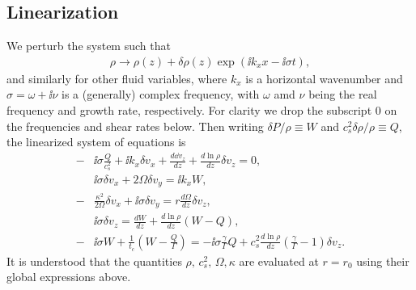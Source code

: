 \subsection{Linearization}
We perturb the system such that
\begin{align}
  \rho \to \rho(z) + \delta\rho(z)\exp{\left(\ii k_x x - \ii\sigma
      t\right)},    
\end{align}
and similarly for other fluid variables, where $k_x$ is a horizontal
wavenumber and $\sigma = \omega + \ii \nu$ is a (generally) complex
frequency, with $\omega$ amd $\nu$ being the real frequency and growth
rate, respectively. For clarity we drop the subscript $0$ on the
frequencies and shear rates below. Then writing $\delta P /\rho \equiv W$
and $c_s^2\delta\rho/\rho\equiv Q$, the linearized system of equations
is   
 \begin{align}
   -&\ii\sigma \frac{Q}{c_s^2} + \ii k_x \delta v_x + \frac{d\dd
     v_z}{dz} + \frac{d\ln{\rho}}{dz}\delta v_z = 0,\label{lin_mass}\\
   &\ii\sigma \delta v_x + 2\Omega\delta v_y = \ii k_x W,\label{lin_vx}\\
   -&\frac{\kappa^2}{2\Omega}\delta v_x + \ii \sigma\delta v_y =
   r\frac{d\Omega}{dz}\delta v_z, \label{lin_vy}\\
   & \ii\sigma\delta v_z = \frac{dW}{dz} +
   \frac{d\ln{\rho}}{dz}\left(W-Q\right), \label{lin_vz}\\
   -&\ii\sigma W + \frac{1}{t_c}\left(W-\frac{Q}{\Gamma}\right) = -\ii\sigma\frac{\gamma}{\Gamma} Q +
   c_s^2\frac{d\ln{\rho}}{dz}\left(\frac{\gamma}{\Gamma}-1\right)\delta v_z.\label{lin_energy}
 \end{align}
It is understood that the quantities $\rho,\,c_s^2,\,\Omega,\kappa$
are evaluated at $r=r_0$ using their global expressions above.  

